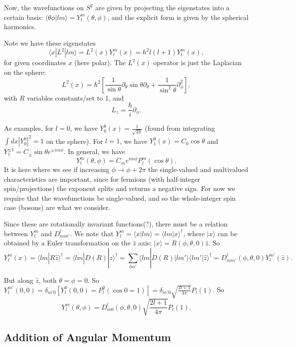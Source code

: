 \documentclass[fontsize=12pt]{scrartcl}
\newcommand{\ptl}{\partial}
\newcommand{\la}{\langle}
\newcommand{\ra}{\rangle}
\begin{document}
Now, the wavefunctions on $S^2$ are given by projecting the eigenstates into a certain basis: $\la \theta\phi|lm\ra = Y^m_l(\theta,\phi)$, and the explicit form is given by the spherical harmonics.

Note we have these eigenstates $$\la x | L^2|lm\ra = L^2(x)Y^m_l(x) = h^2l(l+1)Y_l^m(x),$$ for given coordinates $x$ (here polar). The $L^2(x)$ operator is just the Laplacian on the sphere: $$L^2(x)=\hbar^2 \left[\frac{1}{\sin\theta}\ptl_\theta \sin\theta \ptl_\theta + \frac{1}{\sin^2\theta}\partial_\phi^2\right],$$ with $R$ variables constants/set to 1, and $$L_z=\frac{\hbar}{i}\ptl_\phi.$$

As examples, for $l=0$, we have $Y_0^0(x)=\frac{1}{\sqrt{4\pi}}$ (found from integrating $\int dx |Y_0^0|^2=1$ on the sphere). For $l=1$, we have $Y_1^0(x)=C_0\cos\theta$ and $Y_1^{\pm 1}=C_{\pm}\sin\theta e^{\pm im\phi}$. In general, we have $$Y_l^m(\theta,\phi)=C_me^{im\phi}P_l^m(\cos\theta).$$ It is here where we see if increasing $\phi\to\phi+2\pi$ the single-valued and multivalued characteristics are important, since for fermions (with half-integer spin/projections) the exponent splits and returns a negative sign. For now we require that the wavefunctions be single-valued, and so the whole-integer spin case (bosons) are what we consider.


Since these are rotationally invariant functions(?), there must be a relation between $Y_l^m$ and $D_{mm'}^l$. We note that $Y_l^m=\la x|lm\ra = \la lm|x\ra^\dagger$, where $|x\ra$ can be obtained by a Euler transformation on the $\hat{z}$ axis: $|x\ra = R(\phi,\theta,0)\hat{z}$. So $$Y_l^m(x)=\la lm|R\hat{z}\ra^\dagger=\la lm|D(R)|z\ra^\dagger=\sum_{lm'}\la lm|D(R)|lm'\ra\la lm'|\hat{z}\ra^\dagger=D_{mm'}^l(\phi,\theta,0)Y_l^{m'}(\hat{z}).$$

But along $\hat{z}$, both $\theta=\phi=0$. So $Y_l^{m'}(0,0)=\delta_{m'0}[Y_l^0(0,0)=P_l^0(\cos 0=1)]=\delta_{m'0}\sqrt{\frac{2l+1}{4\pi}}P_l(1)$. So $$Y_l^{m}(\theta,\phi)=D_{m0}^l(\phi,\theta,0)\sqrt{\frac{2l+1}{4\pi}}P_l(1).$$

\subsection{Addition of Angular Momentum}
\end{document}
